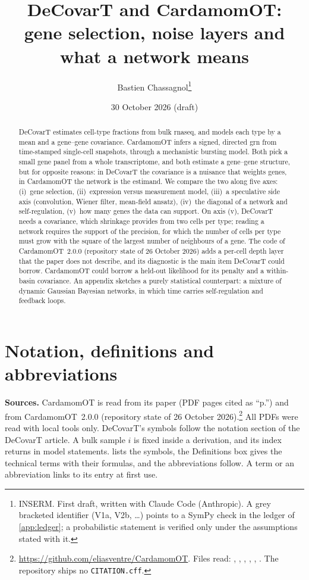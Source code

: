 \documentclass[11pt,a4paper]{article}
\title{\bfseries DeCovarT and CardamomOT:\\ gene selection, noise layers and what a network means}
\author{Bastien Chassagnol\thanks{INSERM. First draft, written with Claude Code (Anthropic). A grey bracketed
identifier (V1a, V2b, \dots) points to a SymPy check in the ledger of \cref{app:ledger}; a probabilistic
statement is verified only under the assumptions stated with it.}}
\date{30 October 2026 (draft)}
\begin{document}
\maketitle
\thispagestyle{fancy}

\begin{abstract}
\noindent DeCovarT \parencite{chassagnolDeCovarTMultidimensionalProbalistic2023} estimates cell-type
fractions from bulk \gls{rnaseq}, and models each type by a mean and a gene--gene covariance. CardamomOT
\parencite{maugeCardamomOTMechanisticOptimal2026} infers a signed, directed \gls{grn}
from time-stamped single-cell snapshots, through a mechanistic bursting model. Both pick a small gene
panel from a whole transcriptome, and both estimate a gene--gene structure, but for opposite reasons: in
DeCovarT the covariance is a nuisance that weights genes, in CardamomOT the network is the estimand. We
compare the two along five axes: (i)~gene selection, (ii)~expression versus measurement model, (iii)~a
speculative side axis (convolution, Wiener filter, mean-field ansatz), (iv)~the diagonal of a network and
self-regulation, (v)~how many genes the data can support. On axis (v), DeCovarT needs a covariance,
which shrinkage provides from two cells per type; reading a network requires the support of the
precision, for which the number of cells per type must grow with the square of the largest number of
neighbours of a gene. The code of CardamomOT~2.0.0 (repository state of 26 October 2026) adds a
per-cell depth layer that the paper does not describe, and its diagnostic is the main item DeCovarT could
borrow. CardamomOT could borrow a held-out likelihood for its penalty and a within-basin covariance. An appendix sketches a purely statistical counterpart: a mixture of dynamic Gaussian Bayesian
networks, in which time carries self-regulation and feedback loops.
\end{abstract}

\section{Notation, definitions and abbreviations}\label{sec:notation}

\textbf{Sources.} CardamomOT is read from its paper (PDF pages cited as \enquote{p.}) and from
CardamomOT~2.0.0 (repository state of 26 October 2026).\footnote{\url{https://github.com/eliasventre/CardamomOT}.
Files read: , , ,
, , . The
repository ships no \texttt{CITATION.cff}.} All PDFs were read with local tools only. DeCovarT's symbols
follow the notation section of the DeCovarT article. A bulk sample $i$ is fixed inside a derivation, and
its index returns in model statements.  lists the symbols, the Definitions box gives
the technical terms with their formulas, and the abbreviations follow. A term or an abbreviation links to
its entry at first use.
\end{document}

